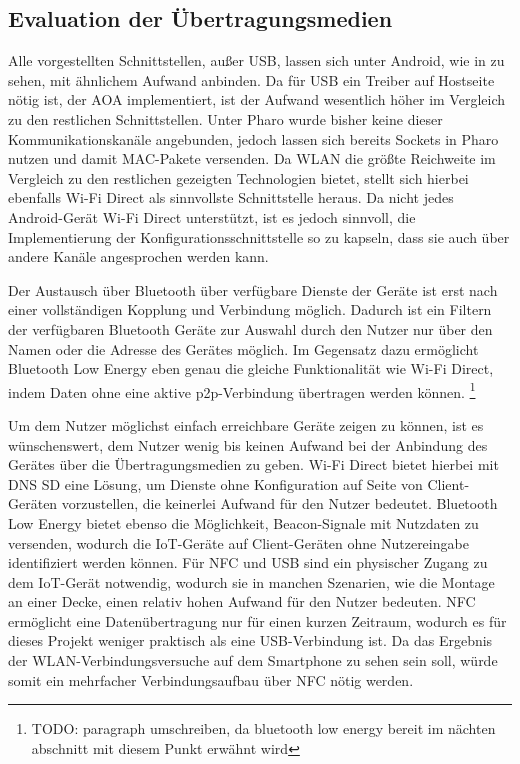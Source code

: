     \subsection{Evaluation der Übertragungsmedien}
    Alle vorgestellten Schnittstellen, außer USB, lassen sich unter Android, wie in \cite{test-repository} zu sehen, mit ähnlichem Aufwand anbinden.
    Da für USB ein Treiber auf Hostseite nötig ist, der AOA implementiert, ist der Aufwand wesentlich höher im Vergleich zu den restlichen Schnittstellen.
    Unter Pharo wurde bisher keine dieser Kommunikationskanäle angebunden,
    jedoch lassen sich bereits Sockets in Pharo nutzen und damit MAC-Pakete versenden.
    Da WLAN die größte Reichweite im Vergleich zu den restlichen gezeigten Technologien bietet, stellt sich hierbei ebenfalls Wi-Fi Direct als sinnvollste Schnittstelle heraus.
    Da nicht jedes Android-Gerät Wi-Fi Direct unterstützt, ist es jedoch sinnvoll, die Implementierung der Konfigurationsschnittstelle so zu kapseln,
    dass sie auch über andere Kanäle angesprochen werden kann.
    
    Der Austausch über Bluetooth über verfügbare Dienste der Geräte ist erst nach einer vollständigen Kopplung und Verbindung möglich.
    Dadurch ist ein Filtern der verfügbaren Bluetooth Geräte zur Auswahl durch den Nutzer nur über den Namen oder die Adresse des Gerätes möglich.
    Im Gegensatz dazu ermöglicht Bluetooth Low Energy eben genau die gleiche Funktionalität wie Wi-Fi Direct, indem Daten ohne eine aktive p2p-Verbindung übertragen werden können.
    \footnote{TODO: paragraph umschreiben, da bluetooth low energy bereit im nächten abschnitt mit diesem Punkt erwähnt wird}

    Um dem Nutzer möglichst einfach erreichbare Geräte zeigen zu können, ist es wünschenswert, dem Nutzer wenig bis keinen Aufwand bei der Anbindung des Gerätes über die Übertragungsmedien zu geben.
    Wi-Fi Direct bietet hierbei mit DNS SD eine Lösung, um Dienste ohne Konfiguration auf Seite von Client-Geräten vorzustellen, die keinerlei Aufwand für den Nutzer bedeutet.
    Bluetooth Low Energy bietet ebenso die Möglichkeit, Beacon-Signale mit Nutzdaten zu versenden, wodurch die IoT-Geräte auf Client-Geräten ohne Nutzereingabe identifiziert werden können.
    Für NFC und USB sind ein physischer Zugang zu dem IoT-Gerät notwendig, wodurch sie in manchen Szenarien, wie die Montage an einer Decke, einen relativ hohen Aufwand für den Nutzer bedeuten.
    NFC ermöglicht eine Datenübertragung nur für einen kurzen Zeitraum, wodurch es für dieses Projekt weniger praktisch als eine USB-Verbindung ist.
    Da das Ergebnis der WLAN-Verbindungsversuche auf dem Smartphone zu sehen sein soll, würde somit ein mehrfacher Verbindungsaufbau über NFC nötig werden.

